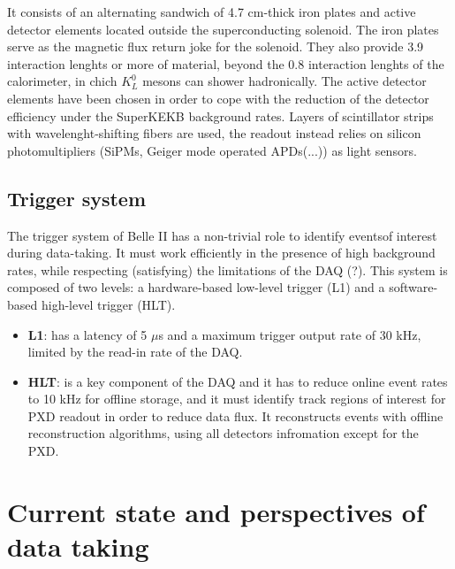 It consists of an alternating sandwich of 4.7 cm-thick iron plates and active detector elements located outside the superconducting solenoid. The iron plates serve as the magnetic flux return joke for the solenoid. They also provide 3.9 interaction lenghts or more of material, beyond the 0.8 interaction lenghts of the calorimeter, in chich $K_{L}^{0}$ mesons can shower hadronically. The active detector elements have been chosen in order to cope with the reduction of the detector efficiency under the SuperKEKB background rates. Layers of scintillator strips with wavelenght-shifting fibers are used, the readout instead relies on silicon photomultipliers (SiPMs, Geiger mode operated APDs(...)) as light sensors.

\subsection{Trigger system}

The trigger system of Belle II has a non-trivial role to identify eventsof interest during data-taking. It must work efficiently in the presence of high background rates, while respecting (satisfying) the limitations of the DAQ (?).
This system is composed of two levels: a hardware-based low-level trigger (L1) and a software-based high-level trigger (HLT). 

\begin{itemize}
\item \textbf{L1}: has a latency of 5 $\mu$s and a maximum trigger output rate of 30 kHz, limited by the read-in rate of the DAQ.
\item \textbf{HLT}: is a key component of the DAQ and it has to reduce online event rates to 10 kHz for offline storage, and it must identify track regions of interest for PXD readout in order to reduce data flux. It reconstructs events with offline reconstruction algorithms, using all detectors infromation except for the PXD.
\end{itemize}





\newpage




\section{Current state and perspectives of data taking}



